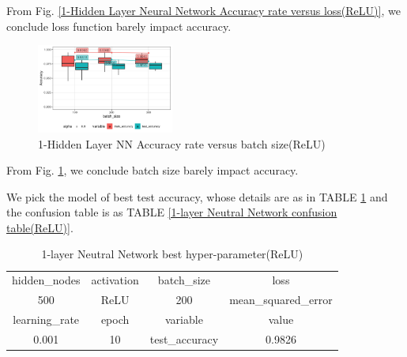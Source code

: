 \documentclass[conference]{IEEEtran}
\begin{document}
From Fig. \ref{1-Hidden Layer Neural Network Accuracy rate versus loss(ReLU)}, we conclude loss function barely impact accuracy.
\begin{figure}[htbp]
\centerline{\includegraphics[width=0.4\textwidth]{figure/91-Hidden Layer Neural Network Accuracy rate versus batch_size.png}}
\caption{1-Hidden Layer NN Accuracy rate versus batch size(ReLU)}
\label{1-Hidden Layer Neural Network Accuracy rate versus batch size(ReLU)}
\end{figure}
From Fig. \ref{1-Hidden Layer Neural Network Accuracy rate versus batch size(ReLU)}, we conclude batch size barely impact accuracy.


We pick the model of best test accuracy, whose details are as in TABLE \ref{1-layer Neutral Network best hyper-parameter(ReLU)} and the confusion table is as TABLE \ref{1-layer Neutral Network confusion table(ReLU)}.
\begin{table}[htbp]
\small
\centering
\caption{1-layer Neutral Network best hyper-parameter(ReLU)}
\begin{tabular}{|c|c|c|c|}
  \hline
 hidden\_nodes & activation & batch\_size & loss \\

 500 & ReLU & 200 & mean\_squared\_error \\
  \hline
 learning\_rate & epoch & variable & value \\ 

 0.001 &   10 & test\_accuracy & 0.9826 \\ 
   \hline
\end{tabular}
\label{1-layer Neutral Network best hyper-parameter(ReLU)}	
\end{table}
\end{document}
